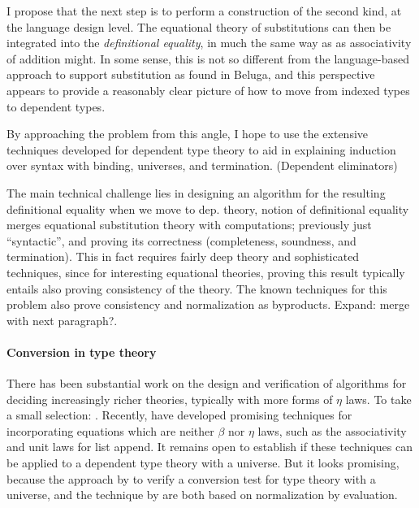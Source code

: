 \documentclass{article}
\newcommand{\LONGVERSION}[1]{{\color{light-gray}#1}}
\begin{document}
I propose that the next step is to perform a construction of the
second kind, at the language design level. The equational theory of
substitutions can then be integrated into the \emph{definitional
 equality}, in much the same way as as associativity of addition
might. In some sense, this is not so
different from the language-based approach to support
substitution as found in Beluga, and this perspective appears to
provide a reasonably clear
picture of how to move from indexed types to dependent types.

By approaching the problem from this angle, I hope to use the
extensive techniques developed for dependent type theory to aid in
explaining induction over syntax with binding, universes, and
termination. \LONGVERSION{(Dependent eliminators)}

The main technical challenge lies in designing an algorithm for the
resulting definitional equality \LONGVERSION{when we move to
  dep. theory, notion of definitional equality merges equational
  substitution theory with computations; previously just ``syntactic''}, and proving its correctness
(completeness, soundness, and termination). This in fact requires fairly deep theory
 and sophisticated techniques, since for interesting equational
 theories, proving this result typically entails also proving
 consistency of the theory. The known techniques for this problem also
 prove consistency and normalization as
 byproducts. \LONGVERSION{Expand: merge with next paragraph?}.


\paragraph{Conversion in type theory} There has been substantial work on the design and verification
of algorithms for deciding increasingly richer theories, typically
with more forms of $\eta$ laws. To take a
small selection: \cite{Coquand91,Harper05,Abel11}. Recently,
\cite{Allais13} have developed promising techniques for incorporating equations
which are neither $\beta$ nor $\eta$ laws, such as the associativity
and unit laws for list append. It remains open to establish if 
these techniques can be applied to a dependent type theory with a
universe. But it looks promising, because the approach by
\cite{Abel07} to verify a conversion test for type theory with a
universe, and the technique by \cite{Allais13} are both based on
normalization by evaluation.
\end{document}
